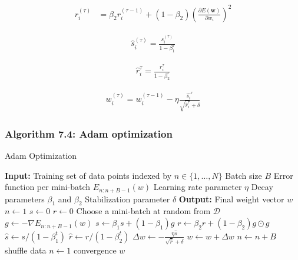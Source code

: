 \documentclass{article}
\begin{document}
\begin{align*}
r_{i}^{(\tau)} & =\beta_{2} r_{i}^{(\tau-1)}+\left(1-\beta_{2}\right)\left(\frac{\partial E(\mathbf{w})}{\partial w_{i}}\right)^{2}  
\tag{7.44}
\end{align*}

\begin{align*}
\widehat{s}_{i}^{(\tau)}=\frac{s_{i}^{(\tau)}}{1-\beta_{1}^{\tau}}  
\tag{7.45}
\end{align*}

\begin{align*}
\widehat{r}_{i}^{\tau} =\frac{r_{i}^{\tau}}{1-\beta_{2}^{\tau}}  
\tag{7.46}
\end{align*}

\begin{align*}
w_{i}^{(\tau)} =w_{i}^{(\tau-1)}-\eta \frac{{\widehat{s_{i}}}^{\tau}}{\sqrt{\widehat{r}_{i}^{\tau}}+\delta}
\tag{7.47}
\end{align*}


\subsubsection{Algorithm 7.4: Adam optimization}

\begin{algorithm}
\caption{Adam Optimization}
\begin{algorithmic}[1]
\STATE \textbf{Input:} Training set of data points indexed by $n \in \{1, \ldots, N\}$
\STATE \quad Batch size $B$
\STATE \quad Error function per mini-batch $E_{n:n+B-1}(w)$
\STATE \quad Learning rate parameter $\eta$
\STATE \quad Decay parameters $\beta_1$ and $\beta_2$
\STATE \quad Stabilization parameter $\delta$
\STATE \textbf{Output:} Final weight vector $w$
\STATE $n \gets 1$
\STATE $s \gets 0$
\STATE $r \gets 0$
\REPEAT
    \STATE Choose a mini-batch at random from $\mathcal{D}$
    \STATE $g \gets -\nabla E_{n:n+B-1}(w)$ 
    \STATE $s \gets \beta_1 s + (1 - \beta_1) g$
    \STATE $r \gets \beta_2 r + (1 - \beta_2) g \odot g$ 
    \STATE $\hat{s} \gets s / (1 - \beta_1^t)$ 
    \STATE $\hat{r} \gets r / (1 - \beta_2^t)$ 
    \STATE $\Delta w \gets -\frac{\eta \hat{s}}{\sqrt{\hat{r}} + \delta}$ 
    \STATE $w \gets w + \Delta w$ 
    \STATE $n \gets n + B$
        \STATE shuffle data
        \STATE $n \gets 1$
    \ENDIF
\UNTIL convergence
\RETURN $w$
\end{algorithmic}
\end{algorithm}
\end{document}
